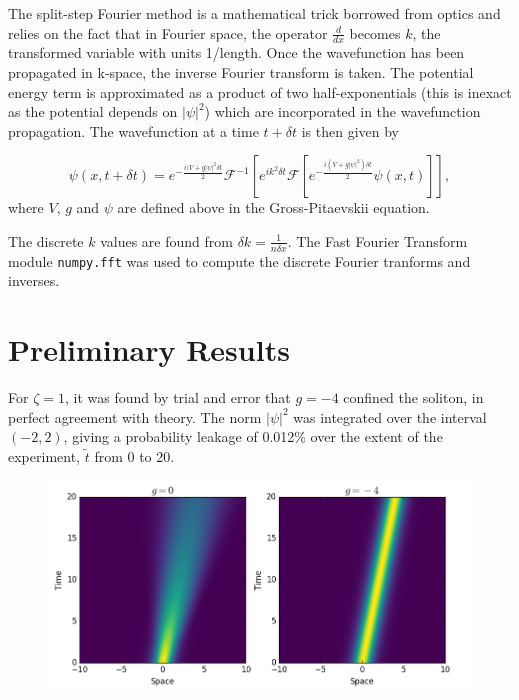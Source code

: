 \documentclass[10pt, twocolumn]{revtex4}    %
\begin{document}
The split-step Fourier method is a mathematical trick borrowed from optics and relies on the fact that in Fourier space, the operator $\frac{d}{dx}$ becomes $k$, the transformed variable with units 1/length. Once the wavefunction has been propagated in k-space, the inverse Fourier transform is taken. The potential energy term is approximated as a product of two half-exponentials (this is inexact as the potential depends on $|\psi|^2$) which are incorporated in the wavefunction propagation. The wavefunction at a time $t+\delta t$ is then given by

\begin{equation} \label{fft}
\psi(x,t+\delta t) = e^{-\frac{i(V+g|\psi|^2 \delta t}{2}} \mathcal{F}^{-1}[e^{ik^2 \delta t} \mathcal{F} [e^{- \frac{i(V+g|\psi|^2) \delta t}{2}} \psi(x,t) ] ],
\end{equation}
where $V$, $g$ and $\psi$ are defined above in the Gross-Pitaevskii equation. 

The discrete $k$ values are found from $\delta k = \frac{1}{n \delta x}$. The Fast Fourier Transform module \texttt{numpy.fft} was used to compute the discrete Fourier tranforms and inverses. 


\section{Preliminary Results} \label{Milestone}

 For $\zeta=1$, it was found by trial and error that $g=-4$ confined the soliton, in perfect agreement with theory. The norm $|\psi|^2$ was integrated over the interval $(-2,2)$, giving a probability leakage of 0.012\% over the extent of the experiment, $\tilde{t}$ from 0 to 20. 

\begin{figure}[h]
\includegraphics[width=\columnwidth]{milestonepic.png}
\end{figure}
\end{document}
